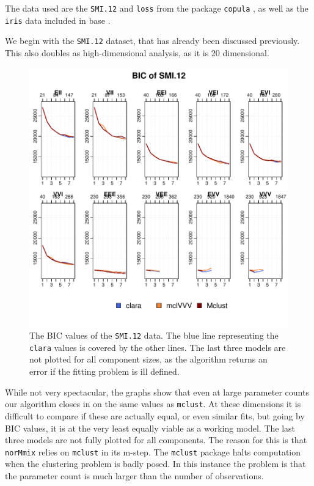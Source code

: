 The data used are the {\tt SMI.12} and {\tt loss} from the package {\tt copula}
\cite{cop18}, as well as the {\tt iris} data included in base \Rp.

We begin with the {\tt SMI.12} dataset, that has already been discussed 
previously. This also doubles as high-dimensional analysis, as it is 20 
dimensional.


\begin{figure}[h!]
    \begin{Rgraph}[0.9]
\includegraphics{chapter3-2smiplot}
    \end{Rgraph}
    \caption{The BIC values of the {\tt SMI.12} data. The blue line representing
             the {\tt clara} values is covered by the other lines. The last 
             three models are not plotted for all component sizes, as the 
             algorithm returns an error if the fitting problem is ill defined.}
    \label{}
\end{figure}

While not very spectacular, the graphs show that even at large parameter
counts our algorithm closes in on the same values as {\tt mclust}.
At these dimensions it is difficult to compare if these are actually 
equal, or even similar fits, but going by BIC values, it is at the very 
least equally viable as a working model.
The last three models are not fully plotted for all components. The reason for 
this is that {\tt norMmix} relies on {\tt mclust} in its m-step. The 
{\tt mclust} package halts computation when the clustering problem is badly 
posed. In this instance the problem is that the parameter count is much larger 
than the number of observations.


